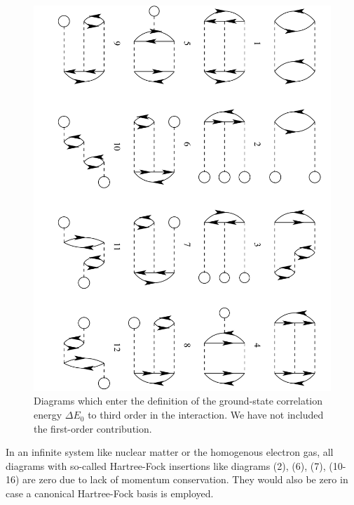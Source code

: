 \begin{figure}[hbtp]
    \includegraphics[width=0.7\linewidth,angle=90]{Chapter8-figures/mbpt.pdf}
      \caption{Diagrams which enter the definition of the ground-state
      correlation energy $\Delta E_0$ to third order in the interaction. We have not included the first-order contribution.}
      \label{fig:goldstone}
\end{figure}
In an infinite system like nuclear matter or the homogenous electron gas, all diagrams with so-called Hartree-Fock insertions like diagrams (2), (6), (7), (10-16) are zero 
due to lack of momentum conservation. They would also be zero in case a canonical \cite{shavittbartlett2009} Hartree-Fock basis is employed. 

